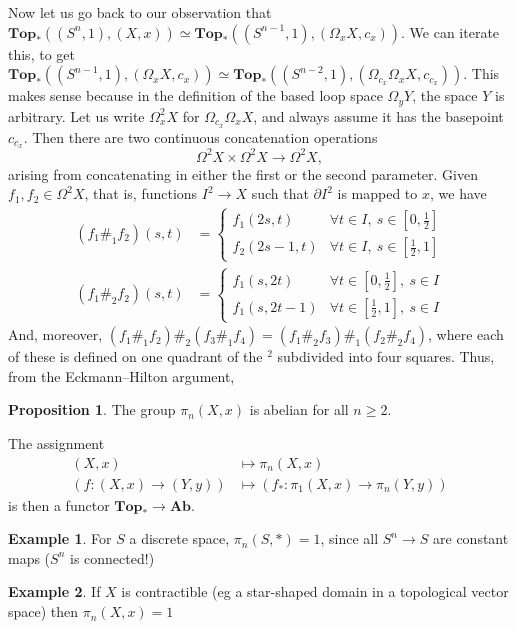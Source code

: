 \documentclass{tufte-handout}
\def\Top {\mathbf{Top}}
\def\Ab {\mathbf{Ab}}
\newcommand{\lecturenum}[1]{\marginnote{\color{red}Lecture #1}}
\theoremstyle{definition}
\newtheorem{prop}{Proposition}
\newtheorem{example}{Example}
\begin{document}
Now let us go back to our observation that $\Top_*((S^n,1),(X,x)) \simeq \Top_*((S^{n-1},1),(\Omega_x X,c_x))$. We can iterate this, to get  $\Top_*((S^{n-1},1),(\Omega_x X,c_x)) \simeq \Top_*((S^{n-2},1),(\Omega_{c_x}\Omega_x X,c_{c_x}))$. This makes sense because in the definition of the based loop space $\Omega_y Y$, the space $Y$ is arbitrary. Let us write $\Omega^2_x X$ for $\Omega_{c_x}\Omega_x X$, and always assume it has the basepoint $c_{c_x}$. Then there are two continuous concatenation operations
\[
	\Omega^2 X \times \Omega^2 X \to \Omega^2 X,
\]
arising from concatenating in either the first or the second parameter. Given $f_1,f_2\in \Omega^2 X$, that is, functions $I^2\to X$ such that $\partial I^2$ is mapped to $x$, we have
\begin{align*}
(f_1 \#_1 f_2)(s,t) & = \begin{cases}
f_1(2s,t) & \forall t\in I,\ s\in [0,\frac12]\\
f_2(2s-1,t) & \forall t\in I,\ s\in [\frac12,1]
\end{cases}\\
(f_1 \#_2 f_2)(s,t) & = \begin{cases}
f_1(s,2t) & \forall t \in [0,\frac12],\ s\in I\\
f_1(s,2t-1) & \forall t\in [\frac12,1],\ s\in I
\end{cases}
\end{align*}
And, moreover, $(f_1 \#_1 f_2) \#_2 (f_3 \#_1 f_4) = (f_1 \#_2 f_3) \#_1 (f_2 \#_2 f_4)$, where each of these is defined on one quadrant of the $^2$ subdivided into four squares. Thus, from the Eckmann--Hilton argument,

\begin{prop}
The group $\pi_n(X,x)$ is abelian for all $n\geq 2$.
\end{prop}


The\lecturenum{18} assignment 
\begin{align*}
(X,x) & \mapsto \pi_n(X,x)\\
\left(f\colon (X,x) \to (Y,y) \right)& \mapsto \left(f_* \colon \pi_1(X,x) \to \pi_n(Y,y) \right)
\end{align*}
is then a functor $\Top_* \to \Ab$.

\begin{example}
For $S$ a discrete space, $\pi_n(S,*) = 1$, since all $S^n \to S$ are constant maps ($S^n$ is connected!)
\end{example}

\begin{example}
If $X$ is contractible (eg a star-shaped domain in a topological vector space) then $\pi_n(X,x) = 1$
\end{example}
\end{document}
